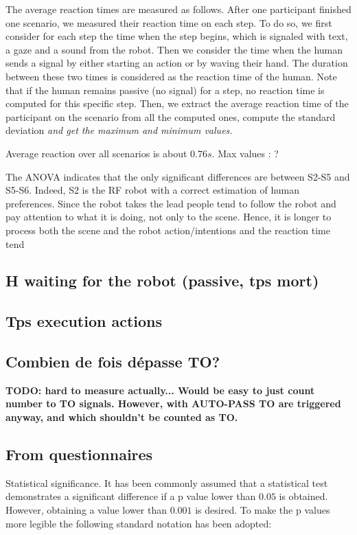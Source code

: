The average reaction times are measured as follows. After one participant finished one scenario, we measured their reaction time on each step. To do so, we first consider for each step the time when the step begins, which is signaled with text, a gaze and a sound from the robot. Then we consider the time when the human sends a signal by either starting an action or by waving their hand. The duration between these two times is considered as the reaction time of the human. Note that if the human remains passive (no signal) for a step, no reaction time is computed for this specific step. Then, we extract the average reaction time of the participant on the scenario from all the computed ones, compute the standard deviation \textit{and get the maximum and minimum values.}

Average reaction over all scenarios is about $0.76s$. Max values : ?

The ANOVA indicates that the only significant differences are between S2-S5 and S5-S6. 
Indeed, S2 is the RF robot with a correct estimation of human preferences. Since the robot takes the lead people tend to follow the robot and pay attention to what it is doing, not only to the scene. Hence, it is longer to process both the scene and the robot action/intentions and the reaction time tend 

\subsection*{H waiting for the robot (passive, tps mort)}

\subsection*{Tps execution actions}

\subsection*{Combien de fois dépasse TO?}
\textbf{TODO: hard to measure actually... Would be easy to just count number to TO signals. However, with AUTO-PASS TO are triggered anyway, and which shouldn't be counted as TO.}

\subsection{From questionnaires}

Statistical significance. It has been commonly assumed that a statistical test demonstrates a significant difference if a p value lower than $0.05$ is obtained. However, obtaining a value lower than $0.001$ is desired. To make the p values more legible the following standard notation has been adopted:

